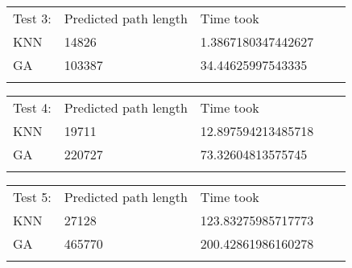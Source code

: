 \documentclass[onecolumn, draftclsnofoot,10pt, compsoc]{IEEEtran}
\begin{document}
\begin{table}[]
\begin{tabular}{lllll}
\cline{1-3}
\multicolumn{1}{|l|}{Test 3:}    & \multicolumn{1}{l|}{Predicted path length} & \multicolumn{1}{l|}{Time took} &  &  \\ \cline{1-3}
\multicolumn{1}{|l|}{KNN} & \multicolumn{1}{l|}{14826}                      & \multicolumn{1}{l|}{1.3867180347442627}          &  &  \\ \cline{1-3}
\multicolumn{1}{|l|}{GA}  & \multicolumn{1}{l|}{103387}                      & \multicolumn{1}{l|}{34.44625997543335}          &  &  \\ \cline{1-3}
                          &                                            &                                &  & 
\end{tabular}
\end{table}
\begin{table}[]
\begin{tabular}{lllll}
\cline{1-3}
\multicolumn{1}{|l|}{Test 4:}    & \multicolumn{1}{l|}{Predicted path length} & \multicolumn{1}{l|}{Time took} &  &  \\ \cline{1-3}
\multicolumn{1}{|l|}{KNN} & \multicolumn{1}{l|}{19711}                      & \multicolumn{1}{l|}{12.897594213485718}          &  &  \\ \cline{1-3}
\multicolumn{1}{|l|}{GA}  & \multicolumn{1}{l|}{220727}                      & \multicolumn{1}{l|}{73.32604813575745}          &  &  \\ \cline{1-3}
                          &                                            &                                &  & 
\end{tabular}
\end{table}
\begin{table}[]
\begin{tabular}{lllll}
\cline{1-3}
\multicolumn{1}{|l|}{Test 5:}    & \multicolumn{1}{l|}{Predicted path length} & \multicolumn{1}{l|}{Time took} &  &  \\ \cline{1-3}
\multicolumn{1}{|l|}{KNN} & \multicolumn{1}{l|}{27128}                      & \multicolumn{1}{l|}{123.83275985717773}          &  &  \\ \cline{1-3}
\multicolumn{1}{|l|}{GA}  & \multicolumn{1}{l|}{465770}                      & \multicolumn{1}{l|}{200.42861986160278}          &  &  \\ \cline{1-3}
                          &                                            &                                &  & 
\end{tabular}
\end{table}
\end{document}
